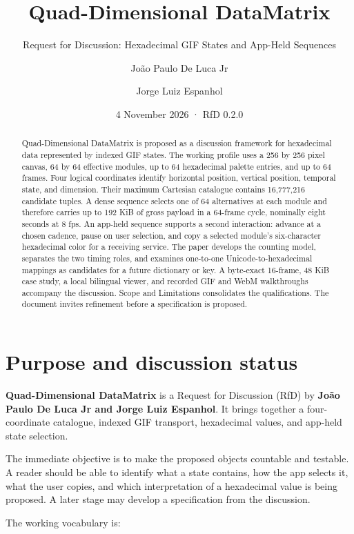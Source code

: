 \documentclass[
  11pt,
  a4paper,
]{article}
\title{Quad-Dimensional DataMatrix}
\subtitle{Request for Discussion: Hexadecimal GIF States and App-Held
Sequences}
\author{João Paulo De Luca Jr \and Jorge Luiz Espanhol}
\date{4 November 2026 · RfD 0.2.0}
\begin{document}
\maketitle
\begin{abstract}
Quad-Dimensional DataMatrix is proposed as a discussion framework for
hexadecimal data represented by indexed GIF states. The working profile
uses a 256 by 256 pixel canvas, 64 by 64 effective modules, up to 64
hexadecimal palette entries, and up to 64 frames. Four logical
coordinates identify horizontal position, vertical position, temporal
state, and dimension. Their maximum Cartesian catalogue contains
16,777,216 candidate tuples. A dense sequence selects one of 64
alternatives at each module and therefore carries up to 192 KiB of gross
payload in a 64-frame cycle, nominally eight seconds at 8 fps. An
app-held sequence supports a second interaction: advance at a chosen
cadence, pause on user selection, and copy a selected module's
six-character hexadecimal color for a receiving service. The paper
develops the counting model, separates the two timing roles, and
examines one-to-one Unicode-to-hexadecimal mappings as candidates for a
future dictionary or key. A byte-exact 16-frame, 48 KiB case study, a
local bilingual viewer, and recorded GIF and WebM walkthroughs accompany
the discussion. Scope and Limitations consolidates the qualifications.
The document invites refinement before a specification is proposed.
\end{abstract}

\hypertarget{purpose-and-discussion-status}{%
\section{Purpose and discussion
status}\label{purpose-and-discussion-status}}

\textbf{Quad-Dimensional DataMatrix} is a Request for Discussion (RfD)
by \textbf{João Paulo De Luca Jr and Jorge Luiz Espanhol}. It brings
together a four-coordinate catalogue, indexed GIF transport, hexadecimal
values, and app-held state selection.

The immediate objective is to make the proposed objects countable and
testable. A reader should be able to identify what a state contains, how
the app selects it, what the user copies, and which interpretation of a
hexadecimal value is being proposed. A later stage may develop a
specification from the discussion.

The working vocabulary is:
\end{document}
